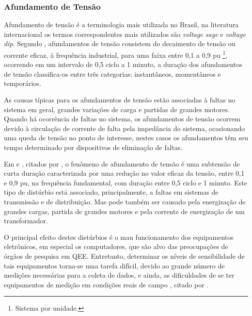 \subsubsection{Afundamento de Tensão}
\par 
Afundamento de tensão é a terminologia mais utilizada no Brasil, na literatura internacional os termos correspondentes mais utilizados são \textit{voltage sage} e \textit{voltage dip}. Segundo \cite{FER99}, afundamentos de tensão consistem do decaimento de tensão ou corrente eficaz, à frequência industrial, para uma faixa entre 0,1 a 0,9 pu \footnote{Sistema por unidade.}, ocorrendo em um intervalo de 0,5 ciclo a 1 minuto, a duração dos afundamentos de tensão classifica-os entre três categorias: instantâneos, momentâneos e temporários.
\par 
As causas típicas para os afundamentos de tensão estão associadas à faltas no sistema em geral, grandes variações de carga e partidas de grandes motores. Quando há ocorrência de faltas no sistema, os afundamentos de tensão ocorrem devido à circulação de corrente de falta pela impedância do sistema, ocasionando uma queda de tensão no ponto de interesse, nestes casos os afundamentos têm seu tempo determinado por dispositivos de eliminação de faltas.
\par
Em \cite{OLIVE} e \cite{SIL01}, citados por \cite{DEL03}, o fenômeno de afundamento de tensão é uma subtensão de curta duração caracterizada por uma redução no valor eficaz da tensão, entre 0,1 e 0,9 pu, na frequência fundamental, com duração entre 0,5 ciclo e 1 minuto. Este tipo de distúrbio está associado, principalmente, a faltas em sistemas de transmissão e de distribuição. Mas pode também ser causado pela energização de grandes cargas, partida de grandes motores e pela corrente de energização de um transformador.
\par
O principal efeito destes distúrbios é o mau funcionamento dos equipamentos eletrônicos, em especial os computadores, que são alvo das preocupações de órgãos de pesquisa em \ac{QEE}. Entretanto, determinar os níveis de sensibilidade de tais equipamentos torna-se uma tarefa difícil, devido ao grande número de medições necessárias para a coleta de dados, e ainda, as dificuldades de se ter equipamentos de medição em condições reais de campo \citep{OLIVE}, citado por \citep{DEL03}.
